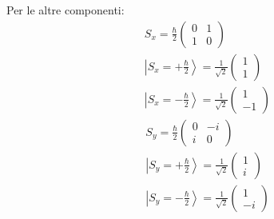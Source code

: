 Per le altre componenti:
\begin{equation}\begin{split}
S_x=\frac{\hbar }{2}\left(\begin{matrix}0&1\\1&0\end{matrix}\right)\\
\left |S_x=+\frac{\hbar }{2} \right\rangle=\frac{1}{\sqrt{2}}\left(\begin{matrix}1\\1\end{matrix}\right)\\
\left |S_x=-\frac{\hbar }{2} \right\rangle=\frac{1}{\sqrt{2}}\left(\begin{matrix}1\\-1\end{matrix}\right)
\end{split}\end{equation}
\begin{equation}\begin{split}
S_y=\frac{\hbar }{2}\left(\begin{matrix}0&-i\\i&0\end{matrix}\right)\\
\left |S_y=+\frac{\hbar }{2} \right\rangle=\frac{1}{\sqrt{2}}\left(\begin{matrix}1\\i\end{matrix}\right)\\
\left |S_y=-\frac{\hbar }{2} \right\rangle=\frac{1}{\sqrt{2}}\left(\begin{matrix}1\\-i\end{matrix}\right)
\end{split}\end{equation}

